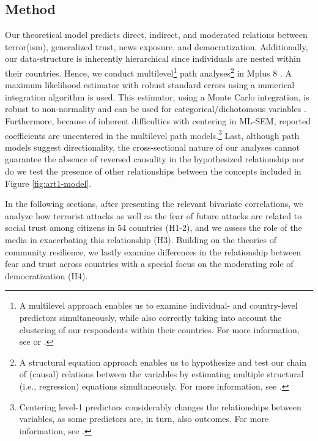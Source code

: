 \subsection{Method}

Our theoretical model predicts direct, indirect, and moderated relations between terror(ism), generalized trust, news exposure, and democratization. Additionally, our data-structure is inherently hierarchical since individuals are nested within their countries. Hence, we conduct multilevel\footnote{A multilevel approach enables us to examine individual- and country-level predictors simultaneously, while also correctly taking into account the clustering of our respondents within their countries. For more information, see \cite{Gelman2007} or \cite{Hox2010}.} path analyses\footnote{A structural equation approach enables us to hypothesize and test our chain of (causal) relations between the variables by estimating multiple structural (i.e., regression) equations simultaneously. For more information, see \cite{Kline2015}.} in Mplus 8 \citep{Muthen2015}. A maximum likelihood estimator with robust standard errors using a numerical integration algorithm is used. This estimator, using a Monte Carlo integration, is robust to non-normality and can be used for categorical/dichotomous variables \citep{Muthen2015}. Furthermore, because of inherent difficulties with centering in ML-SEM, reported coefficients are uncentered in the multilevel path models.\footnote{Centering level-1 predictors considerably changes the relationships between variables, as some predictors are, in turn, also outcomes. For more information, see \cite{CastanhoSilva2019}.} Last, although path models suggest directionality, the cross-sectional nature of our analyses cannot guarantee the absence of reversed causality in the hypothesized relationship nor do we test the presence of other relationships between the concepts included in Figure \ref{fig:art1-model}.

In the following sections, after presenting the relevant bivariate correlations, we analyze how terrorist attacks as well as the fear of future attacks are related to social trust among citizens in 54 countries (H1-2), and we assess the role of the media in exacerbating this relationship (H3). Building on the theories of community resilience, we lastly examine differences in the relationship between fear and trust across countries with a special focus on the moderating role of democratization (H4).


